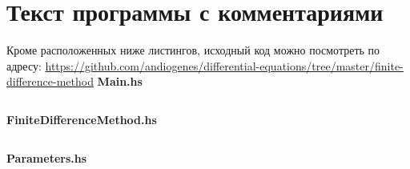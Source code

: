 \documentclass[a4paper,12pt]{article}
\begin{document}
\section{\normalsize{Текст программы с комментариями}}
Кроме расположенных ниже листингов, исходный код можно посмотреть по адресу: \url{https://github.com/andiogenes/differential-equations/tree/master/finite-difference-method}
\linebreak\linebreak\textbf{Main.hs}
\inputminted[breaklines]{haskell}{../app/Main.hs}

\textbf{FiniteDifferenceMethod.hs}
\inputminted[breaklines]{haskell}{../src/FiniteDifferenceMethod.hs}

\textbf{Parameters.hs}
\inputminted[breaklines]{haskell}{../src/Parameters.hs}
\pagebreak
\end{document}
